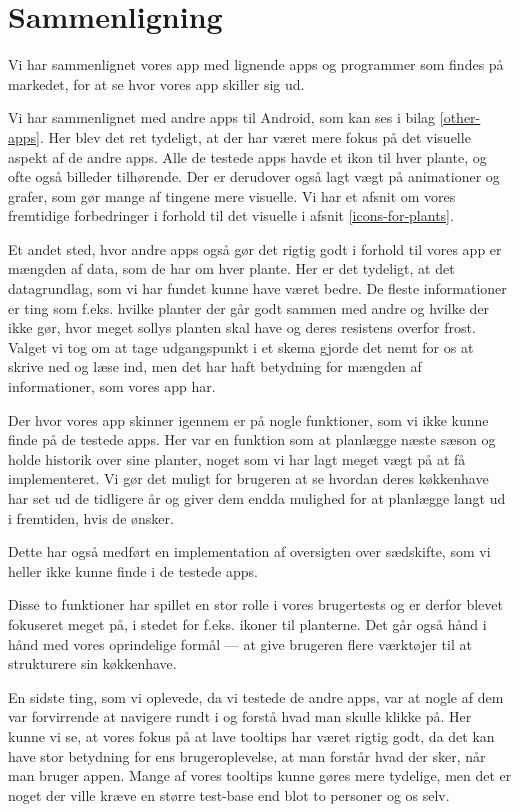 \section{Sammenligning}
Vi har sammenlignet vores app med lignende apps og programmer som findes på markedet, for at se hvor vores app skiller sig ud.

Vi har sammenlignet med andre apps til Android, som kan ses i bilag \ref{other-apps}. Her blev det ret tydeligt, at der har været mere fokus på det visuelle aspekt af de andre apps. Alle de testede apps havde et ikon til hver plante, og ofte også billeder tilhørende. Der er derudover også lagt vægt på animationer og grafer, som gør mange af tingene mere visuelle. Vi har et afsnit om vores fremtidige forbedringer i forhold til det visuelle i afsnit \ref{icons-for-plants}.

Et andet sted, hvor andre apps også gør det rigtig godt i forhold til vores app er mængden af data, som de har om hver plante. Her er det tydeligt, at det datagrundlag, som vi har fundet kunne have været bedre. De fleste informationer er ting som f.eks. hvilke planter der går godt sammen med andre og hvilke der ikke gør, hvor meget sollys planten skal have og deres resistens overfor frost. Valget vi tog om at tage udgangspunkt i et skema gjorde det nemt for os at skrive ned og læse ind, men det har haft betydning for mængden af informationer, som vores app har.

Der hvor vores app skinner igennem er på nogle funktioner, som vi ikke kunne finde på de testede apps. Her var en funktion som at planlægge næste sæson og holde historik over sine planter, noget som vi har lagt meget vægt på at få implementeret. Vi gør det muligt for brugeren at se hvordan deres køkkenhave har set ud de tidligere år og giver dem endda mulighed for at planlægge langt ud i fremtiden, hvis de ønsker.

Dette har også medført en implementation af oversigten over sædskifte, som vi heller ikke kunne finde i de testede apps.

Disse to funktioner har spillet en stor rolle i vores brugertests og er derfor blevet fokuseret meget på, i stedet for f.eks. ikoner til planterne. Det går også hånd i hånd med vores oprindelige formål --- at give brugeren flere værktøjer til at strukturere sin køkkenhave.

En sidste ting, som vi oplevede, da vi testede de andre apps, var at nogle af dem var forvirrende at navigere rundt i og forstå hvad man skulle klikke på. Her kunne vi se, at vores fokus på at lave tooltips har været rigtig godt, da det kan have stor betydning for ens brugeroplevelse, at man forstår hvad der sker, når man bruger appen. Mange af vores tooltips kunne gøres mere tydelige, men det er noget der ville kræve en større test-base end blot to personer og os selv.
